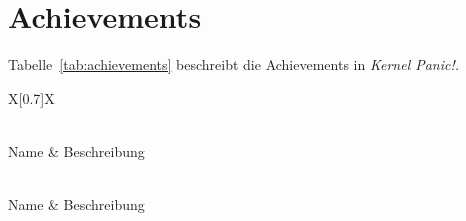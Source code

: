 \pagebreak
\section{Achievements}

%

Tabelle~\ref{tab:achievements} beschreibt die Achievements in \emph{Kernel Panic!.}
\begingroup
  \small
  \tabulinesep=1.2mm
  \begin{longtabu}{X[0.7]X}
    \rowfont{\normalsize}
    \caption{Mögliche Achievements in \emph{Kernel Panic!}\label{tab:achievements}}\\
    \midrule[\heavyrulewidth]\rowfont{\itshape}
    Name & Beschreibung \\
    \midrule\endfirsthead

    \rowfont{\normalsize}
    \caption[]{Achievements (fortges.)}\\
    \midrule[\heavyrulewidth]\rowfont{\itshape}
    Name & Beschreibung \\
    \midrule\endhead

    \bottomrule
     \\
    \endfoot

    \endlastfoot


\end{longtabu}
